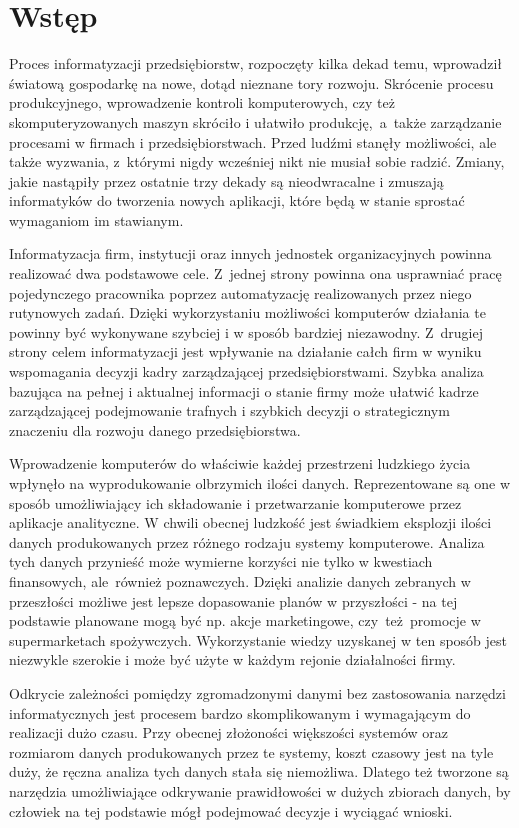 \chapter{Wstęp}
Proces informatyzacji przedsiębiorstw, rozpoczęty kilka dekad temu, wprowadził światową gospodarkę na nowe, dotąd nieznane tory rozwoju. Skrócenie procesu produkcyjnego, wprowadzenie kontroli komputerowych, czy też skomputeryzowanych maszyn skróciło i ułatwiło produkcję,~a~także zarządzanie procesami w firmach i przedsiębiorstwach. Przed ludźmi stanęły możliwości, ale także wyzwania, z~którymi nigdy wcześniej nikt nie musiał sobie radzić. Zmiany, jakie nastąpiły przez ostatnie trzy dekady są nieodwracalne i zmuszają informatyków do tworzenia nowych aplikacji, które będą w stanie sprostać wymaganiom im stawianym.

Informatyzacja firm, instytucji oraz innych jednostek organizacyjnych powinna realizować dwa podstawowe cele. Z~jednej strony powinna ona usprawniać pracę pojedynczego pracownika poprzez automatyzację realizowanych przez niego rutynowych zadań. Dzięki wykorzystaniu możliwości komputerów działania te powinny być wykonywane szybciej i w sposób bardziej niezawodny. Z~drugiej strony celem informatyzacji jest wpływanie na działanie całch firm w wyniku wspomagania decyzji kadry zarządzającej przedsiębiorstwami. Szybka analiza bazująca na pełnej i aktualnej informacji o stanie firmy może ułatwić kadrze zarządzającej podejmowanie trafnych i szybkich decyzji o strategicznym znaczeniu dla rozwoju danego przedsiębiorstwa.

Wprowadzenie komputerów do właściwie każdej przestrzeni ludzkiego życia wpłynęło na wyprodukowanie olbrzymich ilości danych. Reprezentowane są one w sposób umożliwiający ich składowanie i przetwarzanie komputerowe przez aplikacje analityczne. W chwili obecnej ludzkość jest świadkiem eksplozji ilości danych produkowanych przez różnego rodzaju systemy komputerowe. Analiza tych danych przynieść może wymierne korzyści nie tylko w kwestiach finansowych, ale~również poznawczych. Dzięki analizie danych zebranych w przeszłości możliwe jest lepsze dopasowanie planów w przyszłości - na tej podstawie planowane mogą być np. akcje marketingowe, czy~też~promocje w supermarketach spożywczych. Wykorzystanie wiedzy uzyskanej w ten sposób jest niezwykle szerokie i może być użyte w każdym rejonie działalności firmy.

Odkrycie zależności pomiędzy zgromadzonymi danymi bez zastosowania narzędzi informatycznych jest procesem bardzo skomplikowanym i wymagającym do realizacji dużo czasu. Przy obecnej złożoności większości systemów oraz rozmiarom danych produkowanych przez te systemy, koszt czasowy jest na tyle duży, że ręczna analiza tych danych stała się niemożliwa. Dlatego też tworzone są narzędzia umożliwiające odkrywanie prawidłowości w dużych zbiorach danych, by człowiek na tej podstawie mógł podejmować decyzje i wyciągać wnioski.

